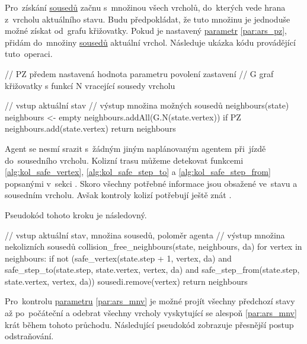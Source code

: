 Pro~získání \hyperref[str:ars_sousedi]{sousedů} začnu s~množinou všech vrcholů,
do~kterých vede hrana z~vrcholu aktuálního stavu.
Budu předpokládat, že tuto množinu je jednoduše možné získat od~grafu křižovatky.
Pokud je nastavený \hyperref[subsubsec:ars_parametry]{parametr} \ref{par:ars_pz},
přidám do~množiny \hyperref[str:ars_sousedi]{sousedů} aktuální vrchol.
Následuje ukázka kódu provádějící tuto~operaci.


\begin{code}[fontsize=\footnotesize]
// PZ předem nastavená hodnota parametru povolení zastavení
// G graf křižovatky s funkcí N vracející sousedy vrcholu

// vstup aktuální stav
// výstup množina možných sousedů
neighbours(state)
  neighbours <- empty
  neighbours.addAll(G.N(state.vertex))
  if PZ
    neighbours.add(state.vertex)
  return neighbours
\end{code}

Agent se nesmí srazit s~žádným jiným naplánovaným agentem při~jízdě do~sousedního vrcholu.
Kolizní trasu můžeme detekovat funkcemi \ref{alg:kol_safe_vertex}, \ref{alg:kol_safe_step_to}
a \ref{alg:kol_safe_step_from} popsanými v~sekci .
Skoro všechny potřebné informace jsou obsažené ve~stavu a sousedním vrcholu.
Avšak kontroly kolizí potřebují ještě znát .

Pseudokód tohoto kroku je následovný.

\begin{code}[fontsize=\footnotesize]
// vstup aktuální stav, množina sousedů, poloměr agenta
// výstup množina nekolizních sousedů
collision_free_neighbours(state, neighbours, da)
  for vertex in neighbours:
    if not (safe_vertex(state.step + 1, vertex, da) and
      safe_step_to(state.step, state.vertex, vertex, da) and
      safe_step_from(state.step, state.vertex, vertex, da))
        sousedi.remove(vertex)
  return neighbours
\end{code}

Pro~kontrolu \hyperref[subsubsec:ars_parametry]{parametru} \ref{par:ars_mnv}
je možné projít všechny předchozí stavy až po~počáteční
a odebrat všechny vrcholy vyskytující se alespoň \ref{par:ars_mnv} krát během tohoto průchodu.
Následující pseudokód zobrazuje přesnější postup odstraňování.

